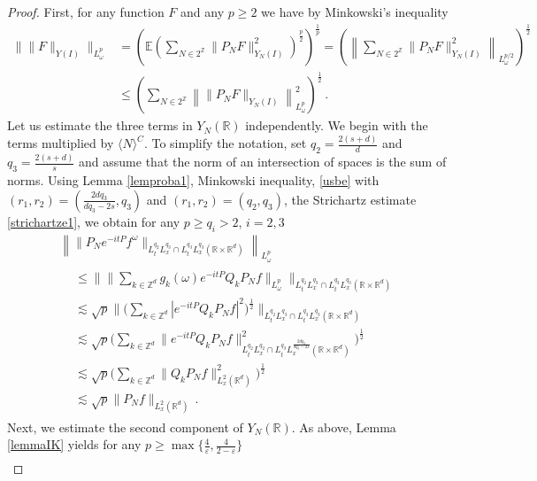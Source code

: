 \documentclass[10pt,leqno]{amsart}
\newcommand{\R}{\mathbb{R}} %
\numberwithin{equation}{section}
\newcommand{\Z}{\mathbb{Z}}
\begin{document}
\begin{proof}
First, for any function $F$ and any $p \geq 2$ we have by Minkowski's inequality 
\begin{align*}
\|\|F \|_{Y(I)} \|_{L_\omega^p} &=  \left(\mathbb{E}\left(\sum_{N \in 2^\Z} \|P_N F\|_{Y_N(I)}^2 \right)^{\frac{p}{2}}\right)^{\frac{1}{p}} = 
\left( \left\|\sum_{N \in 2^\Z} \|P_N F\|_{Y_N(I)}^2 \right\|_{L_\omega^{p/2 }} \right)^{\frac{1}{2}} \\
&\leq 
\left(\sum_{N \in 2^\Z} \left\| \|P_NF\|_{Y_N(I)} \right\|_{L_\omega^{p }}^2 \right)^{\frac{1}{2}} \,.
\end{align*}
Let us estimate the three terms in $Y_N(\R)$ independently. We begin with the terms multiplied by $\langle N \rangle^C$. To simplify the notation,  set $q_2=\frac{2(s+d)}{d}$ and $q_3=\frac{2(s+d)}{s}$
and assume that the norm of an intersection of spaces is the sum of norms.  Using Lemma \ref{lemproba1},
Minkowski inequality, \eqref{usbe} with $(r_1, r_2) = (\frac{2dq_3 }{dq_3 -2s}, q_3)$ and $(r_1, r_2) = (q_2, q_3)$, the Strichartz estimate \eqref{strichartze1}, we obtain for any $p \geq q_i > 2$, $i = 2, 3$
\begin{multline*}
\left\|\|P_{N}e^{-it P} f^\omega \|_{L_t^{q_2} L_x^{q_3} \cap L_t^{q_3} L_x^{q_3} (\R \times \R^d) }  \right\|_{L_\omega^p}\\
\begin{aligned}
&\leq \Big\|  \Big\| \sum_{k \in \Z^d} g_k (\omega) e^{-it P}  Q_k P_N f \Big\|_{L_\omega^p} \Big\|_{L_t^{q_2} L_x^{q_3} \cap L_t^{q_3} L_x^{q_3} (\R \times \R^d) } \\
&\lesssim \sqrt{p} \Big\| \Big( \sum_{k \in \Z^d}  |e^{-it P}  Q_k  P_N f|^2 \Big)^{\frac{1}{2}}  \Big\|_{L_t^{q_2} L_x^{q_3} \cap L_t^{q_3} L_x^{q_3} (\R\times \R^d) } \\
&\lesssim  \sqrt{p} \Big( \sum_{k \in \Z^d} \| e^{-it P}  Q_k P_N f  \|^2_{L_t^{q_2} L_x^{q_2} \cap L_t^{q_3} L_x^{\frac{2dq_3 }{dq_3 -2s}} (\R \times \R^d)}  \Big)^{\frac{1}{2}}\\
&\lesssim   \sqrt{p} \Big( \sum_{k \in \Z^d} \|  Q_k P_N f  \|^2_{L_x^2 (\R^d) } \Big)^{\frac{1}{2}}\\
&\lesssim \sqrt{p} \|P_N f\|_{L_x^2 (\R^d)} \,.
\end{aligned}
\end{multline*}
Next, we estimate the second component of $Y_N (\R)$.  As above, Lemma \ref{lemmaIK} yields for any $p \geq \max\{\frac{4}{\varepsilon}, \frac{4}{2 - \varepsilon}\}$
\begin{multline*}

\end{multline*}
\end{proof}
\end{document}
